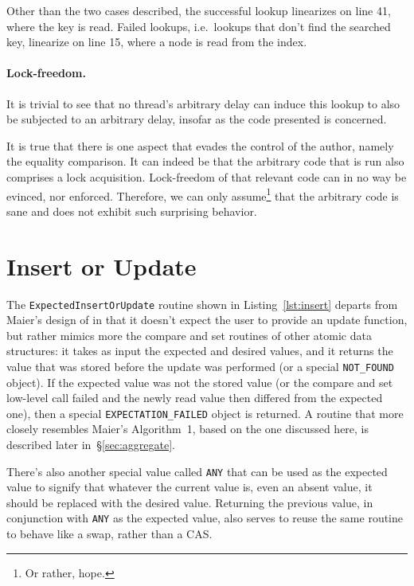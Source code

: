Other than the two cases described, the successful lookup linearizes on line 41, where the key is read.
Failed lookups, i.e.\ lookups that don't find the searched key, linearize on line 15, where a node is read from the index.


\paragraph{Lock-freedom.}

It is trivial to see that no thread's arbitrary delay can induce this lookup to also be subjected to an arbitrary delay, insofar as the code presented is concerned.

It is true that there is one aspect that evades the control of the author, namely the equality comparison.
It can indeed be that the arbitrary code that is run also comprises a lock acquisition.
Lock-freedom of that relevant code can in no way be evinced, nor enforced.
Therefore, we can only assume\footnote{%
	Or rather, hope.
} that the arbitrary code is sane and does not exhibit such surprising behavior.


\section{Insert or Update}\label{sec:insert-or-update}

The \texttt{ExpectedInsertOrUpdate} routine shown in Listing~\ref{lst:insert} departs from Maier's design of \cite[Algorithm~1]{maier} in that it doesn't expect the user to provide an update function, but rather mimics more the compare and set routines of other atomic data structures: it takes as input the expected and desired values, and it returns the value that was stored before the update was performed (or a special \texttt{{NOT\_FOUND}} object).
If the expected value was not the stored value (or the compare and set low-level call failed and the newly read value then differed from the expected one), then a special \texttt{{EXPECTATION\_FAILED}} object is returned.
A routine that more closely resembles Maier's Algorithm~1, based on the one discussed here, is described later in~\S\ref{sec:aggregate}.

There's also another special value called \texttt{ANY} that can be used as the expected value to signify that whatever the current value is, even an absent value, it should be replaced with the desired value.
Returning the previous value, in conjunction with \texttt{ANY} as the expected value, also serves to reuse the same routine to behave like a swap, rather than a CAS\@.

